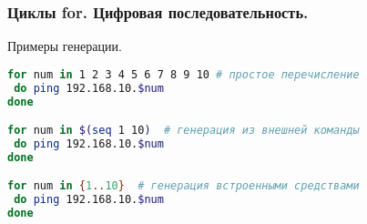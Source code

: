 \begin{frame}[fragile]
\frametitle{Циклы for. Цифровая последовательность.}
  \begin{block}{Примеры генерации.}
\begin{lstlisting}[language=bash,frame=single]
for num in 1 2 3 4 5 6 7 8 9 10 # простое перечисление 
 do ping 192.168.10.$num
done

for num in $(seq 1 10)  # генерация из внешней команды
 do ping 192.168.10.$num
done

for num in {1..10}  # генерация встроенными средствами
 do ping 192.168.10.$num
done
\end{lstlisting}
  \end{block}
\end{frame}
